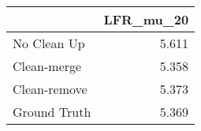 \begin{tabular}{lr}
\toprule
{} & LFR_mu_20 \\
\midrule
No Clean Up  &     5.611 \\
Clean-merge  &     5.358 \\
Clean-remove &     5.373 \\
Ground Truth &     5.369 \\
\bottomrule
\end{tabular}
